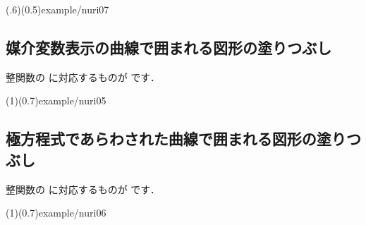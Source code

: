 \showexample[$x=g(y)$で囲まれる図形](.6)(0.5){example/nuri07}

\subsection{媒介変数表示の曲線で囲まれる図形の塗りつぶし}
整関数の  に対応するものが  です．

\showexample[媒介変数表示曲線で囲まれる図形](1)(0.7){example/nuri05}

\subsection{極方程式であらわされた曲線で囲まれる図形の塗りつぶし}
整関数の  に対応するものが  です．

\showexample[極方程式で表される曲線の塗りつぶし](1)(0.7){example/nuri06}

